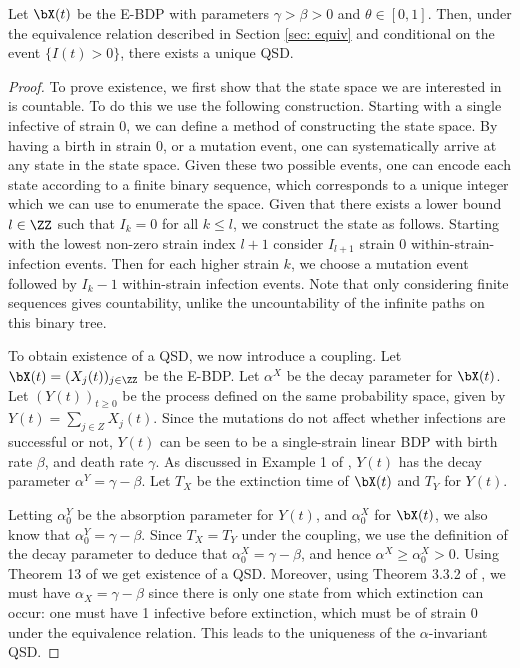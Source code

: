 \documentclass[smallextended]{svjour3}       %
\begin{document}
\begin{mythm}\label{thm: eu bdps}
	Let $\bX(t)$ be the E-BDP with parameters $\gamma > \beta > 0$ and $\theta \in [0,1]$. Then, under the equivalence relation described in Section \ref{sec: equiv} and conditional on the event $\{I(t) > 0\}$, there exists a unique QSD.
\end{mythm}
\begin{proof}
	To prove existence, we first show that the state space we are interested in is countable. To do this we use the following construction. Starting with a single infective of strain 0, we can define a method of constructing the state space. By having a birth in strain 0, or a mutation event, one can systematically arrive at any state in the state space. Given these two possible events, one can encode each state according to a finite binary sequence, which corresponds to a unique integer which we can use to enumerate the space. Given that there exists a lower bound $l \in \ZZ$ such that $I_k = 0$ for all $k \leq l$, we construct the state as follows. Starting with the lowest non-zero strain index $l+1$  consider $I_{l+1}$ strain 0 within-strain-infection events. Then for each higher strain $k$, we choose a mutation event followed by $I_k - 1$ within-strain infection events. 
	Note that only considering finite sequences gives countability, unlike the uncountability of the infinite paths on this binary tree.

	To obtain existence of a QSD, we now introduce a coupling. Let $\bX(t) = (X_j(t))_{j \in \ZZ}$ be the E-BDP. Let $\alpha^X$ be the decay parameter for $\bX(t)$. Let $(Y(t))_{t \geq 0}$ be the process defined on the same probability space, given by $Y(t) = \sum_{j \in Z} X_j(t)$. Since the mutations do not affect whether infections are successful or not, $Y(t)$ can be seen to be a single-strain linear BDP with birth rate $\beta$, and death rate $\gamma$. As discussed in Example 1 of \cite{vanDoorn1991}, $Y(t)$ has the decay parameter $\alpha^Y = \gamma - \beta$. Let $T_X$ be the extinction time of $\bX(t)$ and $T_Y$ for $Y(t)$.
	
	Letting $\alpha^Y_0$ be the absorption parameter for $Y(t)$, and $\alpha_0^X$ for $\bX(t)$, we also know that $\alpha_0^Y = \gamma - \beta$. Since $T_X = T_Y$ under the coupling, we use the definition of the decay parameter to deduce that $\alpha_0^X = \gamma - \beta$, and hence $\alpha^X \geq \alpha_0^X > 0$. Using Theorem 13 of \cite{vanDoorn2013} we get existence of a QSD.
	Moreover, using Theorem 3.3.2 of \cite{jacka1995}, we must have $\alpha_X = \gamma - \beta$ since there is only one state from which extinction can occur: one must have 1 infective before extinction, which must be of strain $0$ under the equivalence relation. This leads to the uniqueness of the $\alpha$-invariant QSD.
\end{proof}
\end{document}
